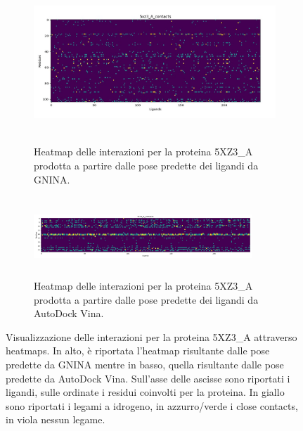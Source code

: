 \begin{figure}
    \centering
    \begin{subfigure}[b]{\textwidth}
        \centering
        \includegraphics[width=\textwidth, height=6cm]{immagini/capitolo4/heatmap_gnina_5xz3_a.jpg}
        \caption[]%
        {{\small Heatmap delle interazioni per la proteina 5XZ3\_A prodotta a partire dalle pose predette dei ligandi da GNINA.}}    
        \label{fig:heatmap_gnina_5xz3_a}
    \end{subfigure}
    \hfill
    \begin{subfigure}[b]{\textwidth}  
        \centering 
        \includegraphics[width=0.9\textwidth, height=3cm]{immagini/capitolo4/heatmap_vina_5xz3_a.jpg}
        \caption[]%
        {{\small Heatmap delle interazioni per la proteina 5XZ3\_A prodotta a partire dalle pose predette dei ligandi da AutoDock Vina.}}    
        \label{fig:heatmap_vina_5xz3_a}
    \end{subfigure}
    \caption[Visualizzazione delle heatmaps per la proteina 5XZ3\_A.]
    {\small Visualizzazione delle interazioni per la proteina 5XZ3\_A attraverso heatmaps. In alto, è riportata l'heatmap risultante dalle pose predette da GNINA mentre in basso, quella risultante dalle pose predette da AutoDock Vina. Sull'asse delle ascisse sono riportati i ligandi, sulle ordinate i residui coinvolti per la proteina. In giallo sono riportati i legami a idrogeno, in azzurro/verde i close contacts, in viola nessun legame. } 
    \label{fig:5xz3_a}
\end{figure}


